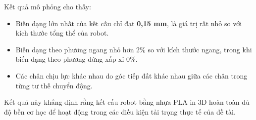 Kết quả mô phỏng cho thấy:
 
\begin{itemize}
    \item Biến dạng lớn nhất của kết cấu chỉ đạt \textbf{0{,}15 mm}, là giá trị rất nhỏ so với kích thước tổng thể của robot.
    \item Biến dạng theo phương ngang nhỏ hơn 2\% so với kích thước ngang, trong khi biến dạng theo phương đứng xấp xỉ 0\%.
    \item Các chân chịu lực khác nhau do góc tiếp đất khác nhau giữa các chân trong từng tư thế chuyển động.
\end{itemize}
 
Kết quả này khẳng định rằng kết cấu robot bằng nhựa PLA in 3D hoàn toàn đủ độ bền cơ học để hoạt động trong các điều kiện tải trọng thực tế của đề tài.
 
